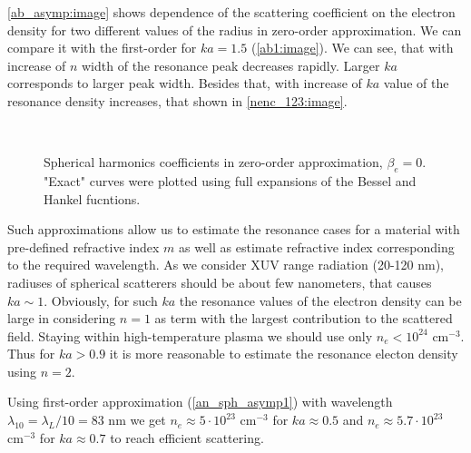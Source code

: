 \autoref{ab_asymp:image} shows dependence of the scattering coefficient on the electron density for two different values of the radius in zero-order approximation. We can compare it with the first-order for $ka = 1.5$ (\autoref{ab1:image}). We can see, that with increase of $n$ width of the resonance peak decreases rapidly. Larger $ka$ corresponds to larger peak width. Besides that, with increase of $ka$ value of the resonance density increases, that shown in \autoref{nenc_123:image}.

    \begin{figure}[H]
        \\
		\caption{Spherical harmonics coefficients in zero-order approximation, $\beta_e = 0$. "Exact" curves were plotted using full expansions of the Bessel and Hankel fucntions.}
		\label{ab_asymp:image}
	\end{figure}


Such approximations allow us to estimate the resonance cases for a material with pre-defined refractive index $m$ as well as estimate refractive index corresponding to the required wavelength. As we consider XUV range radiation (20-120 nm), radiuses of spherical scatterers should be about few nanometers, that causes $ka \sim 1$. Obviously, for such $ ka $ the resonance values of the electron density can be large in considering $n = 1$ as term with the largest contribution to the scattered field. Staying within high-temperature plasma we should use only $n_e < 10^{24}$ $\textrm{cm}^{-3}$. Thus for $ka > 0.9$ it is more reasonable to estimate the resonance electon density using $n = 2$.

Using first-order approximation (\ref{an_sph_asymp1}) with wavelength $\lambda_{10} = \lambda_{L} / 10 = 83$ nm we get $n_e \approx 5 \cdot 10^{23}$ $\textrm{cm}^{-3}$ for $ka \approx 0.5$ and $n_e \approx 5.7 \cdot 10^{23}$ $\textrm{cm}^{-3}$ for $ka \approx 0.7$ to reach efficient scattering.




